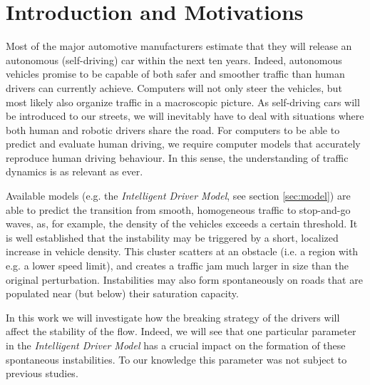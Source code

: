 \section{Introduction and Motivations}
Most of the major automotive manufacturers estimate that they will release an autonomous (self-driving) car within the next ten years. Indeed, autonomous vehicles promise to be capable of both safer and smoother traffic than human drivers can currently achieve. Computers will not only steer the vehicles, but most likely also organize traffic in a macroscopic picture. As self-driving cars will be introduced to our streets, we will inevitably have to deal with situations where both human and robotic drivers share the road. For computers to be able to predict and evaluate human driving, we require computer models that accurately reproduce human driving behaviour. In this sense, the understanding of traffic dynamics is as relevant as ever.

Available models (e.g. the \emph{Intelligent Driver Model}, see section \ref{sec:model}) are able to predict the transition from smooth, homogeneous traffic to stop-and-go waves, as, for example, the density of the vehicles exceeds a certain threshold. It is well established \cite{treiber1999, treiber2000, treiber2013} that the instability may be triggered by a short, localized increase in vehicle density. This cluster scatters at an obstacle (i.e. a region with e.g. a lower speed limit), and creates a traffic jam much larger in size than the original perturbation.
Instabilities may also form spontaneously on roads that are populated near (but below) their saturation capacity.

In this work we will investigate how the breaking strategy of the drivers will affect the stability of the flow. Indeed, we will see that one particular parameter in the \emph{Intelligent Driver Model} has a crucial impact on the formation of these spontaneous instabilities. To our knowledge this parameter was not subject to previous studies.

